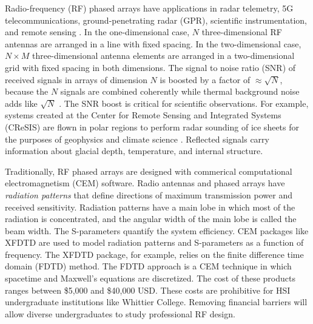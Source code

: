 \documentclass[10pt]{amsart}
\theoremstyle{definition}
\numberwithin{equation}{section}
\begin{document}
\label{sec:top}

Radio-frequency (RF) phased arrays have applications in radar telemetry, 5G telecommunications, ground-penetrating radar (GPR), scientific instrumentation, and remote sensing \cite{Vieregg_2016,AVVA201746,arnold_2020,PhysRevD.105.122006,10.3390/s21186091,10.1016/j.jappgeo.2022.104876,phased_array_book}.  In the one-dimensional case, $N$ three-dimensional RF antennas are arranged in a line with fixed spacing.  In the two-dimensional case, $N \times M$ three-dimensional antenna elements are arranged in a two-dimensional grid with fixed spacing in both dimensions.  The signal to noise ratio (SNR) of received signals in arrays of dimension $N$ is boosted by a factor of $\approx \sqrt{N}$, because the $N$ signals are combined coherently while thermal background noise adds like $\sqrt{N}$ \cite{AVVA201746}.  The SNR boost is critical for scientific observations.  For example, systems created at the Center for Remote Sensing and Integrated Systems (CReSIS) are flown in polar regions to perform radar sounding of ice sheets for the purposes of geophysics and climate science \cite{arnold_2020}.  Reflected signals carry information about glacial depth, temperature, and internal structure.  

Traditionally, RF phased arrays are designed with commerical computational electromagnetism (CEM) software.  Radio antennas and phased arrays have \textit{radiation patterns} that define directions of maximum transmission power and received sensitivity.  Radiation patterns have a main lobe in which most of the radiation is concentrated, and the angular width of the main lobe is called the beam width.  The S-parameters quantify the system efficiency.  CEM packages like XFDTD are used to model radiation patterns and S-parameters as a function of frequency.  The XFDTD package, for example, relies on the finite difference time domain (FDTD) method. The FDTD approach is a CEM technique in which spacetime and Maxwell’s equations are discretized.  The cost of these products ranges between \$5,000 and \$40,000 USD.  These costs are prohibitive for HSI undergraduate institutions like Whittier College.  Removing financial barriers will allow diverse undergraduates to study professional RF design. 
\end{document}
